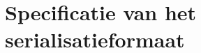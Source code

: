 \chapter{Specificatie van het serialisatieformaat}\label{ch:specificatie-van-het-serialisatieformaat}

\inputminted{json}{generated/serialisation.json}
